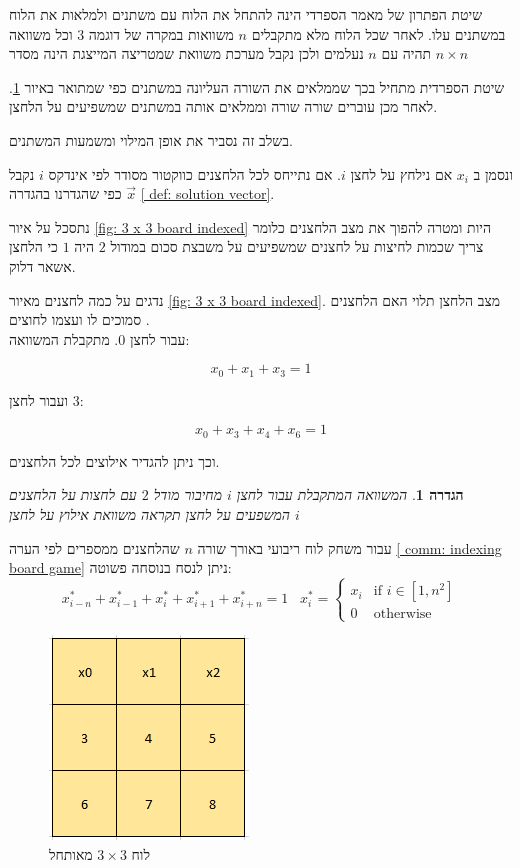 \documentclass[12pt,twoside]{article}
\newtheorem{definition}{הגדרה}[section]
\begin{document}
שיטת הפתרון של מאמר הספרדי הינה להתחל את הלוח עם משתנים ולמלאות את הלוח במשתנים עלו.
לאחר שכל הלוח מלא מתקבלים 
$n$
משוואות במקרה של דוגמה 
$3$
וכל משוואה תהיה עם 
$n$
נעלמים
ולכן נקבל מערכת משוואת שמטריצה המייצגת הינה מסדר 
$n \times n$

שיטת הספרדית מתחיל בכך
שממלאים את השורה העליונה במשתנים
כפי שמתואר באיור 
\ref{fig: 3 x 3 board init spanish}.
לאחר מכן עוברים שורה שורה 
וממלאים אותה במשתנים שמשפיעים על הלחצן.

בשלב זה נסביר את אופן המילוי ומשמעות המשתנים.

ונסמן ב
$x_i$
אם נילחץ על לחצן 
$i$.
אם נתייחס לכל הלחצנים כווקטור מסודר לפי אינדקס
$i$
נקבל 
$\vec{x}$
כפי שהגדרנו בהגדרה 
\ref{ def: solution vector}.

נתסכל על איור 
\ref{fig: 3 x 3 board indexed}
היות ומטרה להפוך את מצב הלחצנים
כלומר צריך שכמות לחיצות על לחצנים שמשפיעים על 
משבצת סכום במודול
$2$
היה 
$1$
כי 
הלחצן אשאר דלוק.

נדגים
על כמה לחצנים מאיור  
\ref{fig: 3 x 3 board indexed}.
מצב הלחצן תלוי האם הלחצנים 
סמוכים לו  ועצמו לחוצים .
\\
עבור 
לחצן 
$0$.
מתקבלת המשוואה:

\[ x_0 + x_1 + x_3 = 1\]

ועבור לחצן 
$3$:

\[ x_0 + x_3 + x_4 + x_6 = 1 \]

וכך ניתן להגדיר אילוצים לכל הלחצנים.

\begin{definition}
    \label{ def: depndeciy equation}
    המשוואה המתקבלת
    עבור לחצן 
    $i$
    מחיבור מודל 
    $2$
    עם לחצות על הלחצנים המשפעים על לחצן 
    תקראה
    משוואת אילוץ על לחצן 
    $i$
\end{definition}

עבור משחק לוח
ריבועי באורך שורה 
$n$
שהלחצנים ממספרים לפי הערה
\ref{ comm: indexing board game}
ניתן לנסח בנוסחה פשוטה:
\begin{equation}
    \label{eq: depndeciy equation}
    x^*_{i - n} + x^*_{i - 1} + x^*_{i} + x^*_{i + 1} + x^*_{i + n} = 1
    \hspace{10pt}
    x^*_i =
    \begin{cases}
        x_i & \text{if $i \in [1,n^2]$} \\
        0 & \text{otherwise}
    \end{cases}
\end{equation}

\begin{figure}[ht]
    \caption{לוח 
    $3 \times 3$
    מאותחל}
    \label{fig: 3 x 3 board init spanish}
    \unsethebrew
    \centering
    \includegraphics[width=.3\textwidth,height=.3\textheight,keepaspectratio]{images/3x3_first_row.PNG}
\end{figure}
\sethebrew
\end{document}
